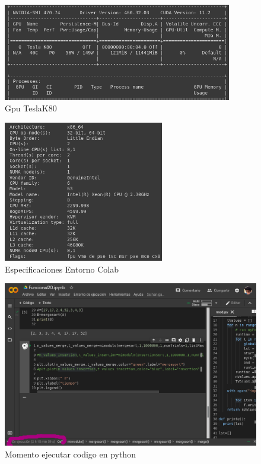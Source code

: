 \documentclass[a4paper]{article}
\begin{document}
\begin{figure}[H]%
\centering
\includegraphics[width=10cm]{imagenes/arq2.png}
\caption{Gpu TeslaK80}
\end{figure}

\begin{figure}[H]%
\centering
\includegraphics[width=7cm]{imagenes/arquitectura2.png}
\caption{Especificaciones Entorno Colab}
\end{figure}


\begin{figure}[H]%
\centering
\includegraphics[width=14cm]{imagenes/cap.png}
\caption{Momento ejecutar codigo en python }
\end{figure}
\end{document}
